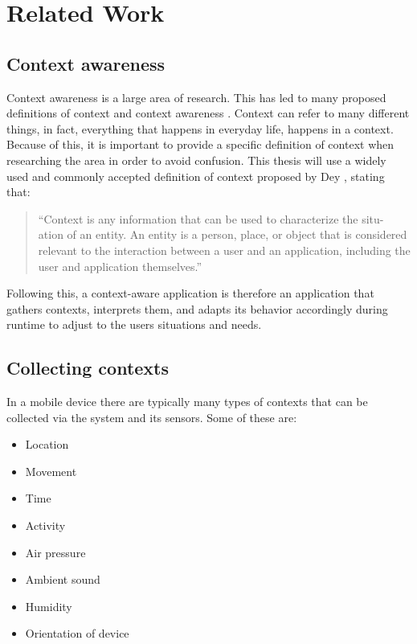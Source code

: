 \chapter{Related Work}
\label{chap:relatedwork}



\section{Context awareness}

Context awareness is a large area of research. This has led to many proposed definitions of context and context awareness \cite{liu2011survey}. Context can refer to many different things, in fact, everything that happens in everyday life, happens in a context. Because of this, it is important to provide a specific definition of context when researching the area in order to avoid confusion. This thesis will use a widely used and commonly accepted definition of context proposed by Dey \cite{dey2000providing}, stating that:
\begin{quote}
``Context is any information that can be used to characterize the situ-
ation of an entity. An entity is a person, place, or object that is considered
relevant to the interaction between a user and an application, including the
user and application themselves.''
\end{quote}
Following this, a context-aware application is therefore an application that gathers contexts, interprets them, and adapts its behavior accordingly during runtime to adjust to the users situations and needs.


\section{Collecting contexts}

In a mobile device there are typically many types of contexts that can be  collected via the system and its sensors. Some of these are:
\begin{itemize}
	\item Location
	\item Movement
	\item Time
	\item Activity
	\item Air pressure
	\item Ambient sound
	\item Humidity
	\item Orientation of device
\end{itemize}


